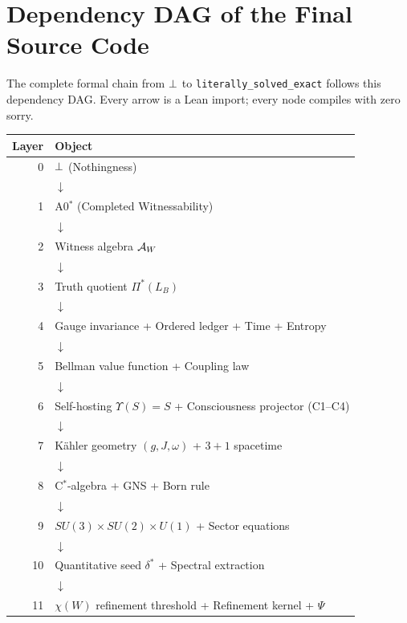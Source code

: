 
\section{Dependency DAG of the Final Source Code}
\label{app:dependency-dag}

The complete formal chain from $\bot$ to \texttt{literally\_solved\_exact}
follows this dependency DAG.  Every arrow is a Lean import; every node
compiles with zero sorry.

\begin{center}
\small
\begin{tabular}{@{}rl@{}}
\textbf{Layer} & \textbf{Object} \\
\hline
0 & $\bot$ (Nothingness) \\
  & $\downarrow$ \\
1 & A0$^*$ (Completed Witnessability) \\
  & $\downarrow$ \\
2 & Witness algebra $\mathcal{A}_W$ \\
  & $\downarrow$ \\
3 & Truth quotient $\Pi^*(L_B)$ \\
  & $\downarrow$ \\
4 & Gauge invariance + Ordered ledger + Time + Entropy \\
  & $\downarrow$ \\
5 & Bellman value function + Coupling law \\
  & $\downarrow$ \\
6 & Self-hosting $\Upsilon(S) = S$ + Consciousness projector (C1--C4) \\
  & $\downarrow$ \\
7 & K\"{a}hler geometry $(g, J, \omega)$ + $3{+}1$ spacetime \\
  & $\downarrow$ \\
8 & C$^*$-algebra + GNS + Born rule \\
  & $\downarrow$ \\
9 & $SU(3) \times SU(2) \times U(1)$ + Sector equations \\
  & $\downarrow$ \\
10 & Quantitative seed $\delta^*$ + Spectral extraction \\
  & $\downarrow$ \\
11 & $\chi(W)$ refinement threshold + Refinement kernel + $\Psi$ \\

\end{tabular}
\end{center}
